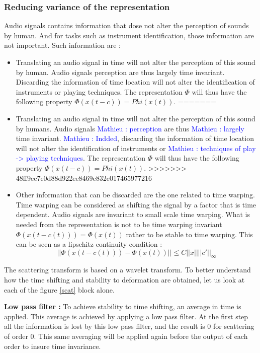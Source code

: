 \documentclass[hidelinks,12pt]{report}
\newcommand{\ml}[1]{\textcolor{blue}{ Mathieu : #1}}
\begin{document}
\subsubsection{Reducing variance of the representation}
Audio signals contains information that dose not alter the perception of sounds by human. And for tasks such as instrument identification, those information are not important. Such information are : 
\begin{itemize}
<<<<<<< HEAD
\item Translating an audio signal in time will not alter the perception of this sound by human. Audio signals perception are thus largely time invariant. Discarding the information of time location will not alter the identification of instruments or playing techniques. The representation $\Phi$ will thus have the following property $\Phi(x(t-c))=Phi(x(t))$.
=======
\item Translating an audio signal in time will not alter the perception of this sound by humans. Audio signals \ml{perception} are thus \ml{largely} time invariant. \ml{Indded}, discarding the information of time location will not alter the identification of instruments or \ml{techniques of play -> playing techniques}. The representation $\Phi$ will thus have the following property $\Phi(x(t-c))=Phi(x(t))$.
>>>>>>> 48ff9ec7e0d88d922ee8469e832e017465977216
\item Other information that can be discarded are the one related to time warping. Time warping can be considered as shifting the signal by a factor that is time dependent. Audio signals are invariant to small scale time warping. What is needed from the representation is not to be time warping invariant $\Phi (x(t-c(t)))=\Phi(x(t))$ rather to be stable to time warping. This can be seen as a lipschitz continuity condition : $$||\Phi (x(t-c(t)))-\Phi(x(t))|| \leq C||x||||c'||_{\infty}$$
\end{itemize}
The scattering transform is based on a wavelet transform. To better understand how the time shifting and stability to deformation are obtained, let us look at each of the figure \ref{scat} block alone.\par
\textbf{Low pass filter :}
To achieve stability to time shifting, an average in time is applied. This average is achieved by applying a low pass filter. At the first step all the information is lost by this low pass filter, and the result is 0 for scattering of order 0. This same averaging will be applied again before the output of each order to insure time invariance.\par
\end{document}
